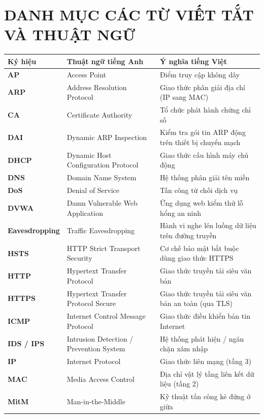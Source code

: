 \chapter*{DANH MỤC CÁC TỪ VIẾT TẮT VÀ THUẬT NGỮ}

\begin{xltabular}{\textwidth}{l l L}
\toprule
\textbf{Ký hiệu} & \textbf{Thuật ngữ tiếng Anh} & \textbf{Ý nghĩa tiếng Việt} \\
\midrule
\endhead

\textbf{AP} & Access Point & Điểm truy cập không dây \\
\textbf{ARP} & Address Resolution Protocol & Giao thức phân giải địa chỉ (IP sang MAC) \\
\textbf{CA} & Certificate Authority & Tổ chức phát hành chứng chỉ số \\
\textbf{DAI} & Dynamic ARP Inspection & Kiểm tra gói tin ARP động trên thiết bị chuyển mạch \\
\textbf{DHCP} & Dynamic Host Configuration Protocol & Giao thức cấu hình máy chủ động \\
\textbf{DNS} & Domain Name System & Hệ thống phân giải tên miền \\
\textbf{DoS} & Denial of Service & Tấn công từ chối dịch vụ \\
\textbf{DVWA} & Damn Vulnerable Web Application & Ứng dụng web kiểm thử lỗ hổng an ninh \\
\textbf{Eavesdropping} & Traffic Eavesdropping & Hành vi nghe lén luồng dữ liệu trên đường truyền \\
\textbf{HSTS} & HTTP Strict Transport Security & Cơ chế bảo mật bắt buộc dùng giao thức HTTPS \\
\textbf{HTTP} & Hypertext Transfer Protocol & Giao thức truyền tải siêu văn bản \\
\textbf{HTTPS} & Hypertext Transfer Protocol Secure & Giao thức truyền tải siêu văn bản an toàn (qua TLS) \\
\textbf{ICMP} & Internet Control Message Protocol & Giao thức điều khiển bản tin Internet \\
\textbf{IDS / IPS} & Intrusion Detection / Prevention System & Hệ thống phát hiện / ngăn chặn xâm nhập \\
\textbf{IP} & Internet Protocol & Giao thức liên mạng (tầng 3) \\
\textbf{MAC} & Media Access Control & Địa chỉ vật lý tầng liên kết dữ liệu (tầng 2) \\
\textbf{MitM} & Man-in-the-Middle & Kỹ thuật tấn công kẻ đứng ở giữa \\

\end{xltabular}

